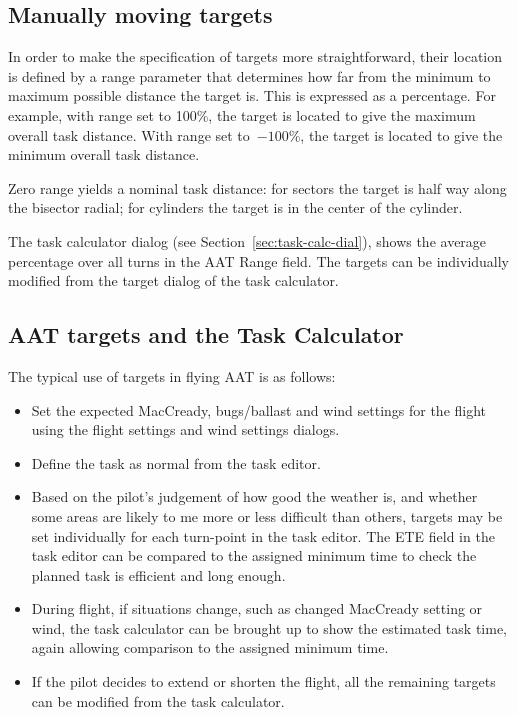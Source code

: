 \documentclass[a4paper,12pt]{refrep}
\begin{document}
\subsection*{Manually moving targets}

In order to make the specification of targets more straightforward,
their location is defined by a range parameter that determines how
far from the minimum to maximum possible distance the target is.  This
is expressed as a percentage.  For example, with range set to 100\%,
the target is located to give the maximum overall task distance.  With
range set to~$-100$\%, the target is located to give the minimum overall
task distance.  

Zero range yields a nominal task distance: for sectors the target is
half way along the bisector radial; for cylinders the target is in the
center of the cylinder.

The task calculator dialog (see Section~\ref{sec:task-calc-dial}), shows the
average percentage over all turns in the AAT Range field.
The targets can be individually modified from the target dialog of the task
calculator.


\subsection*{AAT targets and the Task Calculator}

The typical use of targets in flying AAT is as follows:
\begin{itemize}
\item Set the expected MacCready, bugs/ballast and wind settings
  for the flight using the flight settings and wind settings dialogs.
\item Define the task as normal from the task editor.
\item Based on the pilot's judgement of how good the weather is,
  and whether some areas are likely to me more or less difficult than
  others, targets may be set individually for each turn-point in the
  task editor.  The ETE field in the task editor can be compared to
  the assigned minimum time to check the planned task is efficient and
  long enough.
\item During flight, if situations change, such as changed MacCready setting
  or wind, the task calculator can be brought up to show the estimated
  task time, again allowing comparison to the assigned minimum time.
\item If the pilot decides to extend or shorten the flight, all the remaining
  targets can be modified from the task calculator. 
\end{itemize}
\end{document}

